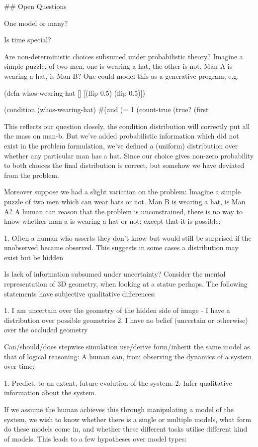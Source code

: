 \documentclass{tlp}
\begin{document}
## Open Questions

One model or many?

Is time special?

Are non-deterministic choices subsumed under probabilistic theory?
Imagine a simple puzzle, of two men, one is wearing a hat, the other is not. Man A is wearing a hat, is Man B?
One could model this as a generative program, e.g.

{%
(defn whos-wearing-hat []
  [(flip 0.5) (flip 0.5)])

(condition (whos-wearing-hat) #(and (= 1 (count-true %
                                    (true? (first %
{%


This reflects our question closely, the condition distribution will correctly put all the mass on man-b.
But we've added probabilistic information which did not exist in the problem formulation, we've defined a (uniform) distribution over whether any particular man has a hat.
Since our choice gives non-zero probability to both choices the final distribution is correct, but somehow we have deviated from the problem.  

Moreover suppose we had a slight variation on the problem:
Imagine a simple puzzle of two men which can wear hats or not. Man B is wearing a hat, is Man A?
A human can reason that the problem is unconstrained, there is no way to know whether man-a is wearing a hat or not; except that it is possible: 

1. Often a human who asserts they don't know but would still be surprised if the unobserved became observed.  This suggests in some cases a distribution may exist but be hidden

Is lack of information subsumed under uncertainty?
Consider the mental representation of 3D geometry, when looking at a statue perhaps.  The following  statements have subjective qualitative differences:

1. I am uncertain over the geometry of the hidden side of image - I have a distribution over possible geometries
2. I have no belief (uncertain or otherwise) over the occluded geometry

Can/should/does stepwise simulation use/derive form/inherit the same model as that of logical reasoning:
A human can, from observing the dynamics of a system over time:

1. Predict, to an extent, future evolution of the system.
2. Infer qualitative information about the system.

If we assume the human achieves this through manipulating a model of the system, we wish to know whether there is a single or multiple models, what form do these models come in, and whether these different tasks utilise different kind of models.  This leads to a few hypotheses over model types:

}}
\end{document}
